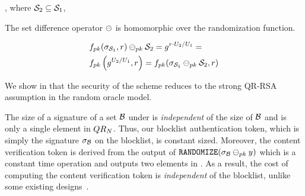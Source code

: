 , where $\genericSetVar[2] \subseteq \genericSetVar[1]$, 


%

\item {} The set difference operator $\sigMinus$ is homomorphic over the randomization function.    


\begin{align*} 
& \randomizeFn[\pubKey](\genericSig[\genericSetVar[1]], \genericRand) 
\sigMinus[\pubKey] \genericSetVar[2] = \qrGen^{\genericRand \fieldMult \accSet[2]/\accSet[1]}  = \\
&\randomizeFn[\pubKey]\left(\qrGen^{\accSet[2]/\accSet[1]}, \genericRand\right) = \randomizeFn[\pubKey](\genericSig[\genericSetVar[1]] \sigMinus[\pubKey] \genericSetVar[2], \genericRand)
\end{align*}

\itemListEnd


We show in  that the security of the scheme reduces to the 
strong QR-RSA assumption in the random oracle model. 



%


\begin{remark}
The size of a signature of a set $\blocklist$ under \ourSigScheme is \emph{independent} of the size of $\blocklist$ and is only a single element in $QR_{N}$. Thus, our blocklist authentication token, which is simply the signature $\genericSig[\blocklist]$ on the blocklist, is constant sized. Moreover, the content verification token is derived from the output of $\randomize(\genericSig[\blocklist] \sigMinus[\pubKey] \genericCInputElmt)$ which is a constant time operation and outputs two elements in \qrGroup. As a result, the cost of computing the content verification token is \emph{independent} of the blocklist, unlike some existing designs~\cite{kulshrestha2021identifying}. 
\end{remark}

